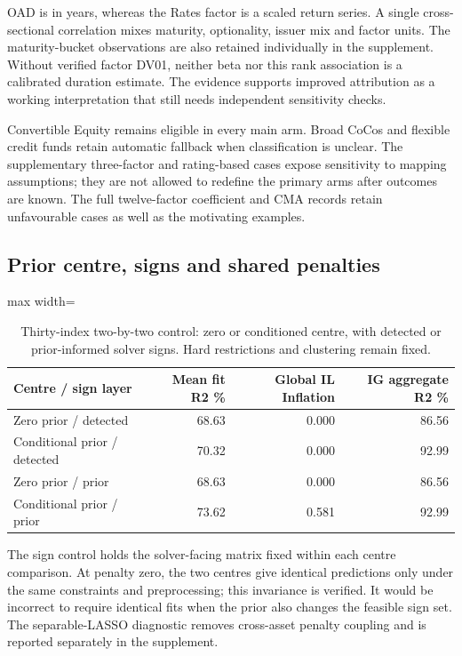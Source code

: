 \documentclass[a4paper,review]{cas-sc}
\begin{document}
OAD is in years, whereas the Rates factor is a scaled return series. A single cross-sectional correlation mixes maturity, optionality, issuer mix and factor units. The maturity-bucket observations are also retained individually in the supplement. Without verified factor DV01, neither beta nor this rank association is a calibrated duration estimate. The evidence supports improved attribution as a working interpretation that still needs independent sensitivity checks.

Convertible Equity remains eligible in every main arm. Broad CoCos and flexible credit funds retain automatic fallback when classification is unclear. The supplementary three-factor and rating-based cases expose sensitivity to mapping assumptions; they are not allowed to redefine the primary arms after outcomes are known. The full twelve-factor coefficient and CMA records retain unfavourable cases as well as the motivating examples.

\subsection{Prior centre, signs and shared penalties}

\begin{table}[pos=htbp]
\centering
\small
\caption{Thirty-index two-by-two control: zero or conditioned centre, with detected or prior-informed solver signs. Hard restrictions and clustering remain fixed.}
\begin{adjustbox}{max width=\linewidth}
\begin{tabular}{lrrr}
\toprule
Centre / sign layer & Mean fit R2 \% & Global IL Inflation & IG aggregate R2 \% \\
\midrule
Zero prior / detected & 68.63 & 0.000 & 86.56 \\
Conditional prior / detected & 70.32 & 0.000 & 92.99 \\
Zero prior / prior & 68.63 & 0.000 & 86.56 \\
Conditional prior / prior & 73.62 & 0.581 & 92.99 \\
\bottomrule
\end{tabular}
\end{adjustbox}
\end{table}

The sign control holds the solver-facing matrix fixed within each centre comparison. At penalty zero, the two centres give identical predictions only under the same constraints and preprocessing; this invariance is verified. It would be incorrect to require identical fits when the prior also changes the feasible sign set. The separable-LASSO diagnostic removes cross-asset penalty coupling and is reported separately in the supplement.
\end{document}
